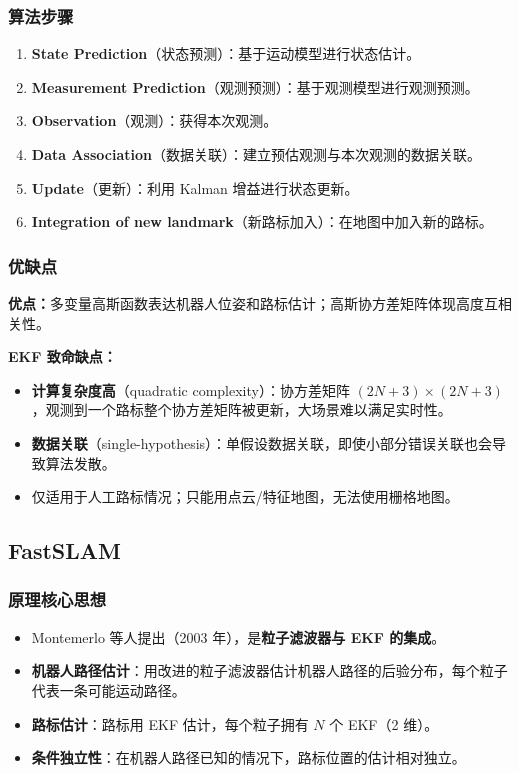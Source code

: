 \documentclass[11pt,a4paper]{article}
\begin{document}
\subsubsection*{算法步骤}
\begin{enumerate}
  \item \textbf{State Prediction}（状态预测）：基于运动模型进行状态估计。
  \item \textbf{Measurement Prediction}（观测预测）：基于观测模型进行观测预测。
  \item \textbf{Observation}（观测）：获得本次观测。
  \item \textbf{Data Association}（数据关联）：建立预估观测与本次观测的数据关联。
  \item \textbf{Update}（更新）：利用 Kalman 增益进行状态更新。
  \item \textbf{Integration of new landmark}（新路标加入）：在地图中加入新的路标。
\end{enumerate}

\subsubsection*{优缺点}
\begin{notebox}
\textbf{优点：}多变量高斯函数表达机器人位姿和路标估计；高斯协方差矩阵体现高度互相关性。

\textbf{EKF 致命缺点：}
\begin{itemize}
  \item \textbf{计算复杂度高}（quadratic complexity）：协方差矩阵 $(2N+3)\times(2N+3)$，观测到一个路标整个协方差矩阵被更新，大场景难以满足实时性。
  \item \textbf{数据关联}（single-hypothesis）：单假设数据关联，即使小部分错误关联也会导致算法发散。
  \item 仅适用于人工路标情况；只能用点云/特征地图，无法使用栅格地图。
\end{itemize}
\end{notebox}

\subsection{FastSLAM}

\subsubsection*{原理核心思想}
\begin{keypoint}
\begin{itemize}
  \item Montemerlo 等人提出（2003 年），是\textbf{粒子滤波器与 EKF 的集成}。
  \item \textbf{机器人路径估计}：用改进的粒子滤波器估计机器人路径的后验分布，每个粒子代表一条可能运动路径。
  \item \textbf{路标估计}：路标用 EKF 估计，每个粒子拥有 $N$ 个 EKF（2 维）。
  \item \textbf{条件独立性}：在机器人路径已知的情况下，路标位置的估计相对独立。
\end{itemize}
\end{keypoint}
\end{document}
